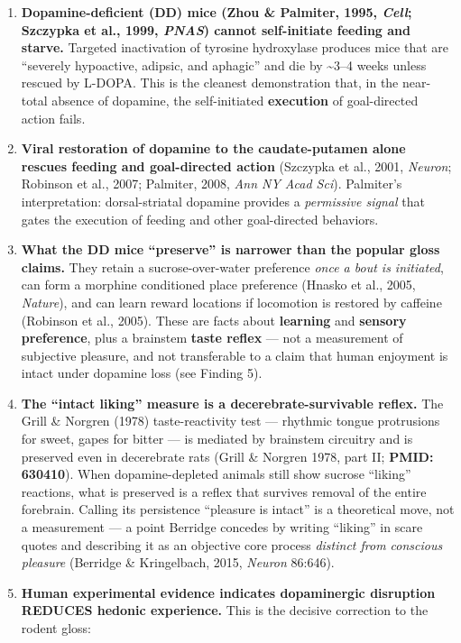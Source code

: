 \begin{enumerate}
\def\labelenumi{\arabic{enumi}.}
\item
  \textbf{Dopamine-deficient (DD) mice (Zhou \& Palmiter, 1995, \emph{Cell}; Szczypka et al., 1999, \emph{PNAS}) cannot self-initiate feeding and starve.} Targeted inactivation of tyrosine hydroxylase produces mice that are ``severely hypoactive, adipsic, and aphagic'' and die by \textasciitilde3--4 weeks unless rescued by L-DOPA. This is the cleanest demonstration that, in the near-total absence of dopamine, the self-initiated \textbf{execution} of goal-directed action fails.
\item
  \textbf{Viral restoration of dopamine to the caudate-putamen alone rescues feeding and goal-directed action} (Szczypka et al., 2001, \emph{Neuron}; Robinson et al., 2007; Palmiter, 2008, \emph{Ann NY Acad Sci}). Palmiter's interpretation: dorsal-striatal dopamine provides a \emph{permissive signal} that gates the execution of feeding and other goal-directed behaviors.
\item
  \textbf{What the DD mice ``preserve'' is narrower than the popular gloss claims.} They retain a sucrose-over-water preference \emph{once a bout is initiated}, can form a morphine conditioned place preference (Hnasko et al., 2005, \emph{Nature}), and can learn reward locations if locomotion is restored by caffeine (Robinson et al., 2005). These are facts about \textbf{learning} and \textbf{sensory preference}, plus a brainstem \textbf{taste reflex} --- not a measurement of subjective pleasure, and not transferable to a claim that human enjoyment is intact under dopamine loss (see Finding 5).
\item
  \textbf{The ``intact liking'' measure is a decerebrate-survivable reflex.} The Grill \& Norgren (1978) taste-reactivity test --- rhythmic tongue protrusions for sweet, gapes for bitter --- is mediated by brainstem circuitry and is preserved even in decerebrate rats (Grill \& Norgren 1978, part II; \textbf{PMID: 630410}). When dopamine-depleted animals still show sucrose ``liking'' reactions, what is preserved is a reflex that survives removal of the entire forebrain. Calling its persistence ``pleasure is intact'' is a theoretical move, not a measurement --- a point Berridge concedes by writing ``liking'' in scare quotes and describing it as an objective core process \emph{distinct from conscious pleasure} (Berridge \& Kringelbach, 2015, \emph{Neuron} 86:646).
\item
  \textbf{Human experimental evidence indicates dopaminergic disruption REDUCES hedonic experience.} This is the decisive correction to the rodent gloss:


\end{enumerate}
